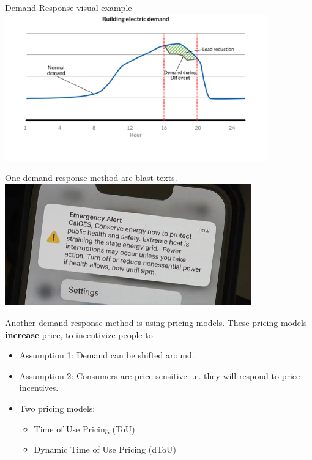 \documentclass{beamer}
\begin{document}
\begin{frame}{Demand Response visual example}
  \centering
  \includegraphics[width=0.85\textwidth]{images/demand-response.png}
\end{frame}

\begin{frame}{One demand response method are blast texts.}
  \centering
  \includegraphics[width=0.8\textwidth]{images/OES-power-text.png}
\end{frame}

\begin{frame}{Another demand response method is using pricing models.}
  These pricing models \textbf{increase} price, to incentivize people to 
  \begin{itemize}
    \item<+-> Assumption 1: Demand can be shifted around.
    \item<+-> Assumption 2: Consumers are price sensitive i.e. they will respond to price incentives.
    \item<+-> Two pricing models:
    \begin{itemize}
      \item<+-> Time of Use Pricing (ToU)
      \item<+-> Dynamic Time of Use Pricing (dToU)
    \end{itemize}
  \end{itemize}
\end{frame}
\end{document}
